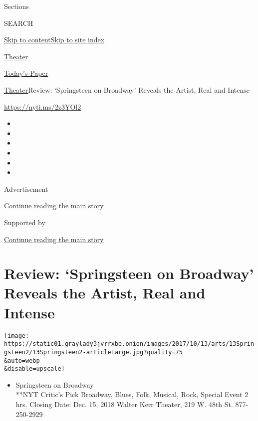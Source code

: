 Sections

SEARCH

\protect\hyperlink{site-content}{Skip to
content}\protect\hyperlink{site-index}{Skip to site index}

\href{https://www.nytimes3xbfgragh.onion/section/theater}{Theater}

\href{https://myaccount.nytimes3xbfgragh.onion/auth/login?response_type=cookie\&client_id=vi}{}

\href{https://www.nytimes3xbfgragh.onion/section/todayspaper}{Today's
Paper}

\href{/section/theater}{Theater}\textbar{}Review: `Springsteen on
Broadway' Reveals the Artist, Real and Intense

\url{https://nyti.ms/2z3YOl2}

\begin{itemize}
\item
\item
\item
\item
\item
\item
\end{itemize}

Advertisement

\protect\hyperlink{after-top}{Continue reading the main story}

Supported by

\protect\hyperlink{after-sponsor}{Continue reading the main story}

\hypertarget{review-springsteen-on-broadway-reveals-the-artist-real-and-intense}{%
\section{Review: `Springsteen on Broadway' Reveals the Artist, Real and
Intense}\label{review-springsteen-on-broadway-reveals-the-artist-real-and-intense}}

\texttt{[image: https://static01.graylady3jvrrxbe.onion/images/2017/10/13/arts/13Springsteen2/13Springsteen2-articleLarge.jpg?quality=75\\\&auto=webp\\\&disable=upscale]}

\begin{itemize}
\tightlist
\item
  Springsteen on Broadway\\
  **NYT Critic's Pick Broadway, Blues, Folk, Musical, Rock, Special
  Event 2 hrs. Closing Date: Dec. 15, 2018 Walter Kerr Theater, 219 W.
  48th St. 877-250-2929
\end{itemize}

